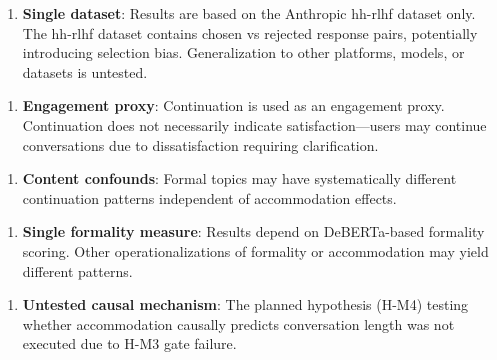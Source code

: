 \begin{enumerate}
\item \textbf{Single dataset}: Results are based on the Anthropic hh-rlhf dataset only. The hh-rlhf dataset contains chosen vs rejected response pairs, potentially introducing selection bias. Generalization to other platforms, models, or datasets is untested.
\end{enumerate}

\begin{enumerate}
\item \textbf{Engagement proxy}: Continuation is used as an engagement proxy. Continuation does not necessarily indicate satisfaction---users may continue conversations due to dissatisfaction requiring clarification.
\end{enumerate}

\begin{enumerate}
\item \textbf{Content confounds}: Formal topics may have systematically different continuation patterns independent of accommodation effects.
\end{enumerate}

\begin{enumerate}
\item \textbf{Single formality measure}: Results depend on DeBERTa-based formality scoring. Other operationalizations of formality or accommodation may yield different patterns.
\end{enumerate}

\begin{enumerate}
\item \textbf{Untested causal mechanism}: The planned hypothesis (H-M4) testing whether accommodation causally predicts conversation length was not executed due to H-M3 gate failure.
\end{enumerate}

